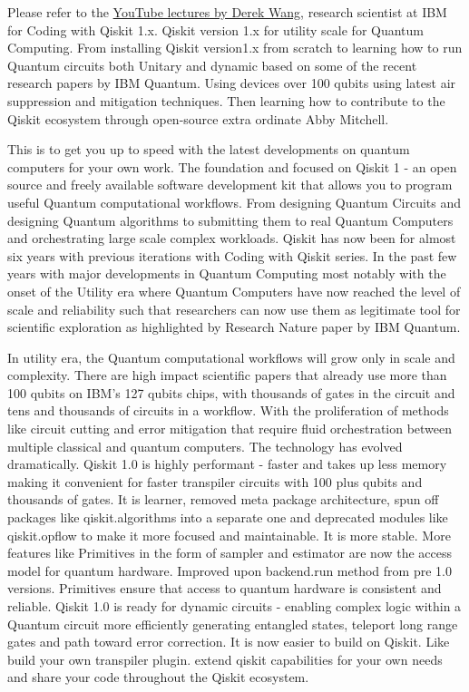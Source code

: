 Please refer to the \href{https://www.youtube.com/watch?v=oaAjxcIFLtM}{YouTube lectures by Derek Wang}, research scientist at IBM for 
Coding with Qiskit 1.x. Qiskit version 1.x for utility scale for Quantum Computing. From installing Qiskit version1.x from scratch 
to learning how to run Quantum circuits both Unitary and dynamic based on some of the recent research papers by IBM Quantum. Using devices over 100 qubits using 
latest air suppression and mitigation techniques. Then learning how to contribute to the Qiskit ecosystem through open-source extra ordinate Abby Mitchell.

This is to get you up to speed with the latest developments on quantum computers for your own work. The foundation and focused on Qiskit 1 - an open source and freely available software development kit that allows you to program useful Quantum computational workflows. From designing Quantum Circuits and designing Quantum algorithms to submitting them to real Quantum Computers and orchestrating large scale complex workloads. Qiskit has now been for almost six years with previous iterations with Coding with Qiskit series. In the past few years with major developments in Quantum Computing most notably with the onset of the Utility era where Quantum Computers have now reached the level of scale and reliability such that researchers can now use them as legitimate tool for scientific exploration as highlighted by Research Nature paper by IBM Quantum. 

In utility era, the Quantum computational workflows will grow only in scale and complexity. There are high impact scientific papers that already use more than 100 qubits on IBM's 127 qubits chips, with thousands of gates in the circuit and tens and thousands of circuits in a workflow. With the proliferation of methods like circuit cutting and error mitigation that require fluid orchestration between multiple classical and quantum computers. The technology has evolved dramatically. Qiskit 1.0 is highly performant - faster and takes up less memory making it convenient for faster transpiler circuits with 100 plus qubits and thousands of gates. It is learner, removed meta package architecture, spun off packages like qiskit.algorithms into a separate one and deprecated modules like qiskit.opflow to make it more focused and maintainable. It is more stable. More features like Primitives in the form of sampler and estimator are now the access model for quantum hardware. Improved upon backend.run method from pre 1.0 versions. Primitives ensure that access to quantum hardware is consistent and reliable. Qiskit 1.0 is ready for dynamic circuits - enabling complex logic within a Quantum circuit more efficiently generating entangled states, teleport long range gates and path toward error correction. It is now easier to build on Qiskit. Like build your own transpiler plugin. extend qiskit capabilities for your own needs and share your code throughout the Qiskit ecosystem. 

